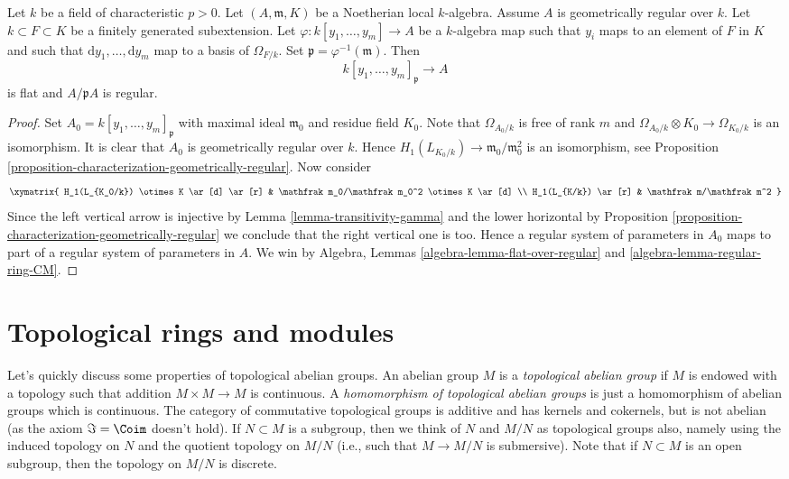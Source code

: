 \begin{lemma}
\label{lemma-geometrically-regular-over-field}
Let $k$ be a field of characteristic $p > 0$. Let $(A, \mathfrak m, K)$
be a Noetherian local $k$-algebra. Assume $A$ is geometrically regular
over $k$. Let $k \subset F \subset K$ be a finitely generated subextension.
Let $\varphi : k[y_1, \ldots, y_m] \to A$ be a $k$-algebra map
such that $y_i$ maps to an element of $F$ in $K$ and such that
$\text{d}y_1, \ldots, \text{d}y_m$ map to a basis of $\Omega_{F/k}$.
Set $\mathfrak p = \varphi^{-1}(\mathfrak m)$. Then
$$
k[y_1, \ldots, y_m]_\mathfrak p \to A
$$
is flat and $A/\mathfrak pA$ is regular.
\end{lemma}

\begin{proof}
Set $A_0 = k[y_1, \ldots, y_m]_\mathfrak p$ with maximal ideal
$\mathfrak m_0$ and residue field $K_0$. Note that
$\Omega_{A_0/k}$ is free of rank $m$ and
$\Omega_{A_0/k} \otimes K_0 \to \Omega_{K_0/k}$ is an isomorphism.
It is clear that $A_0$ is geometrically regular over $k$. Hence
$H_1(L_{K_0/k}) \to \mathfrak m_0/\mathfrak m_0^2$ is an isomorphism, see
Proposition \ref{proposition-characterization-geometrically-regular}.
Now consider
$$
\xymatrix{
H_1(L_{K_0/k}) \otimes K \ar[d] \ar[r] &
\mathfrak m_0/\mathfrak m_0^2 \otimes K \ar[d] \\
H_1(L_{K/k}) \ar[r] & \mathfrak m/\mathfrak m^2
}
$$
Since the left vertical arrow is injective by
Lemma \ref{lemma-transitivity-gamma}
and the lower horizontal by
Proposition \ref{proposition-characterization-geometrically-regular}
we conclude that the right vertical one is too.
Hence a regular system of parameters in $A_0$ maps to
part of a regular system of parameters in $A$.
We win by
Algebra, Lemmas \ref{algebra-lemma-flat-over-regular} and
\ref{algebra-lemma-regular-ring-CM}.
\end{proof}












\section{Topological rings and modules}
\label{section-topological-ring}

\noindent
Let's quickly discuss some properties of topological abelian groups.
An abelian group $M$ is a {\it topological abelian group} if $M$ is
endowed with a topology such that addition $M \times M \to M$ is
continuous. A {\it homomorphism of topological abelian groups}
is just a homomorphism of abelian groups which is continuous.
The category of commutative topological groups is additive and
has kernels and cokernels, but is not abelian (as the axiom
$\Im = \Coim$ doesn't hold). If $N \subset M$ is a
subgroup, then we think of $N$ and $M/N$ as topological groups
also, namely using the induced topology on $N$ and the quotient
topology on $M/N$ (i.e., such that $M \to M/N$ is submersive).
Note that if $N \subset M$ is an open subgroup, then the topology
on $M/N$ is discrete.

